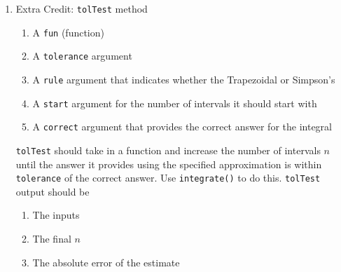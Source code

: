 \documentclass[
]{article}
\begin{document}
\begin{enumerate}
\begin{enumerate}
\end{enumerate}

\begin{enumerate}
\item Extra Credit: \texttt{tolTest} method
\begin{enumerate}
\item A \texttt{fun} (function)
\item A \texttt{tolerance} argument
\item A \texttt{rule} argument that indicates whether the Trapezoidal or Simpson's 
\item A \texttt{start} argument for the number of intervals it should start with
\item A \texttt{correct} argument that provides the correct answer for the integral
\end{enumerate}



\texttt{tolTest} should take in a function and increase the number of intervals $n$ until the answer it provides using the specified approximation is within \texttt{tolerance} of the correct answer. Use \texttt{integrate()} to do this. \texttt{tolTest} output should be
\begin{enumerate}
\item The inputs
\item The final $n$
\item The absolute error of the estimate
\end{enumerate}
\end{enumerate}



\end{enumerate}
\end{document}
